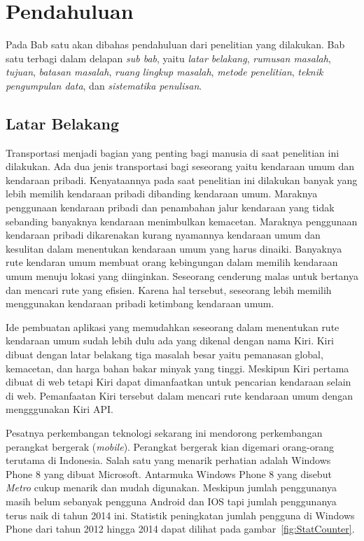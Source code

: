 \chapter{Pendahuluan}
\label{chap:intro}

Pada Bab satu akan dibahas pendahuluan dari penelitian yang dilakukan. Bab satu terbagi dalam delapan \textit{sub bab}, yaitu \textit{latar belakang}, \textit{rumusan masalah}, \textit{tujuan}, \textit{batasan masalah}, \textit{ruang lingkup masalah}, \textit{metode penelitian}, \textit{teknik pengumpulan data}, dan \textit{sistematika penulisan}.

\section{Latar Belakang}
\label{sec:latar_belakang}
\hspace{0.5cm} Transportasi menjadi bagian yang penting bagi manusia di saat penelitian ini dilakukan. Ada dua jenis transportasi bagi seseorang yaitu kendaraan umum dan kendaraan pribadi. Kenyataannya pada saat penelitian ini dilakukan banyak yang lebih memilih kendaraan pribadi dibanding kendaraan umum. Maraknya penggunaan kendaraan pribadi dan penambahan jalur kendaraan yang tidak sebanding banyaknya kendaraan menimbulkan kemacetan. Maraknya penggunaan kendaraan pribadi dikarenakan kurang nyamannya kendaraan umum dan kesulitan dalam menentukan kendaraan umum yang harus dinaiki. Banyaknya rute kendaran umum membuat orang kebingungan dalam memilih kendaraan umum menuju lokasi yang diinginkan. Seseorang cenderung malas untuk bertanya dan mencari rute yang efisien. Karena hal tersebut, seseorang lebih memilih menggunakan kendaraan pribadi ketimbang kendaraan umum. 

\hspace{0.5cm} Ide pembuatan aplikasi yang memudahkan seseorang dalam menentukan rute kendaraan umum sudah lebih dulu ada yang dikenal dengan nama Kiri. Kiri dibuat dengan latar belakang tiga masalah besar yaitu pemanasan global, kemacetan, dan harga bahan bakar minyak yang tinggi\footnotemark[1]. Meskipun Kiri pertama dibuat di web tetapi Kiri dapat dimanfaatkan untuk pencarian kendaraan selain di web. Pemanfaatan Kiri tersebut dalam mencari rute kendaraan umum dengan mengggunakan Kiri API.

\hspace{0.5cm} Pesatnya perkembangan teknologi sekarang ini mendorong perkembangan perangkat bergerak (\textit{mobile}). Perangkat bergerak kian digemari orang-orang terutama di Indonesia. Salah satu yang menarik perhatian adalah Windows Phone 8 yang dibuat Microsoft. Antarmuka Windows Phone 8 yang disebut \textit{Metro} cukup menarik dan mudah digunakan. Meskipun jumlah penggunanya masih belum sebanyak pengguna Android dan IOS tapi jumlah penggunanya terus naik di tahun 2014 ini. Statistik peningkatan jumlah pengguna di Windows Phone dari tahun 2012 hingga 2014 dapat dilihat pada gambar~\ref{fig:StatCounter}.

